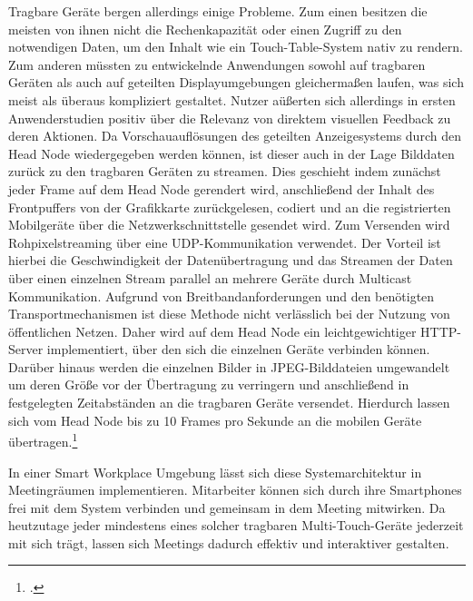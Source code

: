 Tragbare Geräte bergen allerdings einige Probleme. Zum einen besitzen die meisten von ihnen nicht die Rechenkapazität oder einen Zugriff zu den notwendigen Daten, um den Inhalt wie ein Touch-Table-System nativ zu rendern. Zum anderen müssten zu entwickelnde Anwendungen sowohl auf tragbaren Geräten als auch auf geteilten Displayumgebungen gleichermaßen laufen, was sich meist als überaus kompliziert gestaltet. Nutzer aüßerten sich allerdings in ersten Anwenderstudien positiv über die Relevanz von direktem visuellen Feedback zu deren Aktionen. Da Vorschauauflösungen des geteilten Anzeigesystems durch den Head Node wiedergegeben werden können, ist dieser auch in der Lage Bilddaten zurück zu den tragbaren Geräten zu streamen. Dies geschieht indem zunächst jeder Frame auf dem Head Node gerendert wird, anschließend der Inhalt des Frontpuffers von der Grafikkarte zurückgelesen, codiert und an die registrierten Mobilgeräte über die Netzwerkschnittstelle gesendet wird.
Zum Versenden wird Rohpixelstreaming über eine UDP-Kommunikation verwendet. Der Vorteil ist hierbei die Geschwindigkeit der Datenübertragung und das Streamen der Daten über einen einzelnen Stream parallel an mehrere Geräte durch Multicast Kommunikation. Aufgrund von Breitbandanforderungen und den benötigten Transportmechanismen ist diese Methode nicht verlässlich bei der Nutzung von öffentlichen Netzen. Daher wird auf dem Head Node ein leichtgewichtiger HTTP-Server implementiert, über den sich die einzelnen Geräte verbinden können. Darüber hinaus werden die einzelnen Bilder in JPEG-Bilddateien umgewandelt um deren Größe vor der Übertragung zu verringern und anschließend in festgelegten Zeitabständen an die tragbaren Geräte versendet. Hierdurch lassen sich vom Head Node bis zu 10 Frames pro Sekunde an die mobilen Geräte übertragen.\footcite[Vgl.][Seite 652 f.]{Table}

In einer Smart Workplace Umgebung lässt sich diese Systemarchitektur in Meetingräumen implementieren. Mitarbeiter können sich durch ihre Smartphones frei mit dem System verbinden und gemeinsam in dem Meeting mitwirken. Da heutzutage jeder mindestens eines solcher tragbaren Multi-Touch-Geräte jederzeit mit sich trägt, lassen sich Meetings dadurch effektiv und interaktiver gestalten.